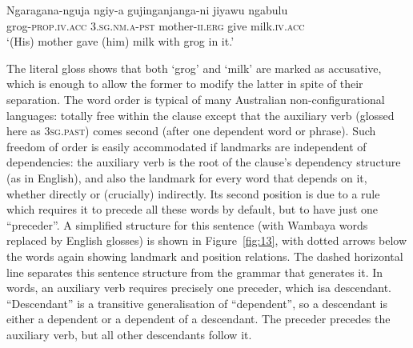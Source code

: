 \documentclass[output=paper
	        ,collection
	        ,collectionchapter
 	        ,biblatex
                ,babelshorthands
                ,newtxmath
                ,draftmode
                ,colorlinks, citecolor=brown
]{langscibook}
\begin{document}
\begin{exe}
	\ex \label{ex:19}
	\gll Ngaragana-nguja ngiy-a gujinganjanga-ni jiyawu ngabulu\\
	grog\textsc{-prop}.\textsc{iv}.\textsc{acc} 3.\textsc{sg}.\textsc{nm}.\textsc{a}-\textsc{pst} mother-\textsc{ii}.\textsc{erg} give milk.\textsc{iv}.\textsc{acc}\\
	\glt ‘(His) mother gave (him) milk with grog in it.’
\end{exe}

The literal gloss shows that both ‘grog’ and ‘milk’ are marked as accusative, which is enough to allow the former to modify the latter in spite of their separation. The word order is typical of many Australian non-configurational languages: totally free within the clause except that the auxiliary verb (glossed here as \textsc{3sg.past}) comes second (after one dependent word or phrase). Such freedom of order is easily accommodated if landmarks are independent of dependencies: the auxiliary verb is the root of the clause’s dependency structure (as in English), and also the landmark for every word that depends on it, whether directly or (crucially) indirectly. Its second position is due to a rule which requires it to precede all these words by default, but to have just one ``preceder''. A simplified structure for this sentence (with Wambaya words replaced by English glosses) is shown in Figure~\ref{fig:13}, with dotted arrows below the words again showing landmark and position relations. The dashed horizontal line separates this sentence structure from the grammar that generates it. In words, an auxiliary verb requires precisely one preceder, which isa descendant. ``Descendant'' is a transitive generalisation of ``dependent'', so a descendant is either a dependent or a dependent of a descendant. The preceder precedes the auxiliary verb, but all other descendants follow it.
\end{document}
